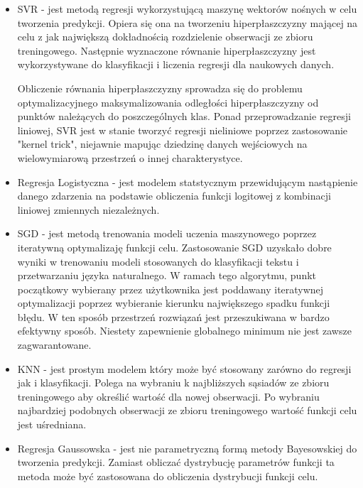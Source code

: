 \begin{itemize}
    \item SVR - jest metodą regresji wykorzystującą maszynę wektorów nośnych w celu tworzenia
    predykcji. Opiera się ona na tworzeniu hiperpłaszczyzny mającej na celu z jak największą
    dokładnością rozdzielenie obserwacji ze zbioru treningowego. Następnie wyznaczone
    równanie hiperpłaszczyzny jest wykorzystywane do klasyfikacji i liczenia regresji dla naukowych
    danych.

    Obliczenie równania hiperpłaszczyzny sprowadza się do problemu optymalizacyjnego
    maksymalizowania odległości hiperpłaszczyzny od punktów należących do poszczególnych klas.
    Ponad przeprowadzanie regresji liniowej, SVR jest w stanie tworzyć regresji nieliniowe
    poprzez zastosowanie "kernel trick", niejawnie mapując dziedzinę danych wejściowych na 
    wielowymiarową przestrzeń o innej charakterystyce.
    
    \item Regresja Logistyczna - jest modelem statstycznym przewidującym nastąpienie danego
    zdarzenia na podstawie obliczenia funkcji logitowej z kombinacji liniowej zmiennych 
    niezależnych.

    \item SGD - jest metodą trenowania modeli uczenia maszynowego poprzez iteratywną optymalizaję
    funkcji celu. Zastosowanie SGD uzyskało dobre wyniki w trenowaniu modeli stosowanych
    do klasyfikacji tekstu i przetwarzaniu języka naturalnego. W ramach tego algorytmu,
    punkt początkowy wybierany przez użytkownika jest poddawany iteratywnej optymalizacji
    poprzez wybieranie kierunku największego spadku funkcji błędu. W ten sposób przestrzeń rozwiązań
    jest przeszukiwana w bardzo efektywny sposób. Niestety zapewnienie globalnego minimum
    nie jest zawsze zagwarantowane.

    \item KNN - jest prostym modelem który może być stosowany zarówno do regresji jak i klasyfikacji.
    Polega na wybraniu k najbliższych sąsiadów ze zbioru treningowego aby określić wartość dla nowej
    obserwacji. Po wybraniu najbardziej podobnych obserwacji ze zbioru treningowego wartość funkcji
    celu jest uśredniana.

    \item Regresja Gaussowska - jest nie parametryczną formą metody Bayesowskiej do tworzenia
    predykcji. Zamiast obliczać dystrybucję parametrów funkcji ta metoda może być zastosowana do
    obliczenia dystrybucji funkcji celu.
    

\end{itemize}
